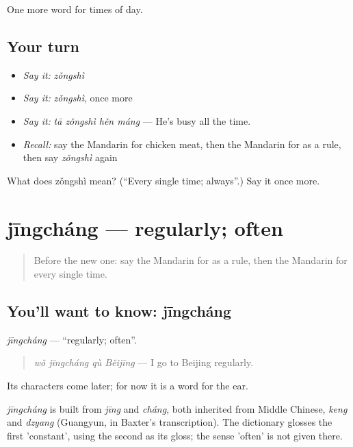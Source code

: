 \begin{grammarlens}[title={What you've built}]
One more word for times of day.
\end{grammarlens}

\subsection*{Your turn}
\begin{itemize}
\raggedright
  \item \emph{Say it:} \emph{zǒngshì}
  \item \emph{Say it:} \emph{zǒngshì}, once more
  \item \emph{Say it:} \emph{tā zǒngshì hěn máng} — He's busy all the time.
  \item \emph{Recall:} say the Mandarin for chicken meat, then the Mandarin for as a rule, then say \emph{zǒngshì} again
\end{itemize}

\begin{tcolorbox}[breakable,colback=teal!4,colframe=teal!35!black,title={Before you move on}]
What does zǒngshì mean? (\textquotedblleft{}Every single time; always\textquotedblright{}.) Say it once more.
\end{tcolorbox}
\section[jīngcháng]{jīngcháng — regularly; often}

\label{lesson:ZH-C162-jingchang}



\begin{quote}
Before the new one: say the Mandarin for as a rule, then the Mandarin for every single time.
\end{quote}

\subsection*{You'll want to know: jīngcháng}
\emph{jīngcháng} — \textquotedblleft{}regularly; often\textquotedblright{}.

\begin{quote}
\emph{wǒ jīngcháng qù Běijīng} — I go to Beijing regularly.
\end{quote}

Its characters come later; for now it is a word for the ear.

\begin{cousinweb}
\emph{jīngcháng} is built from \emph{jīng} and \emph{cháng}, both inherited from Middle Chinese, \emph{keng} and \emph{dzyang} (Guangyun, in Baxter's transcription). The dictionary glosses the first 'constant', using the second as its gloss; the sense 'often' is not given there.
\end{cousinweb}

